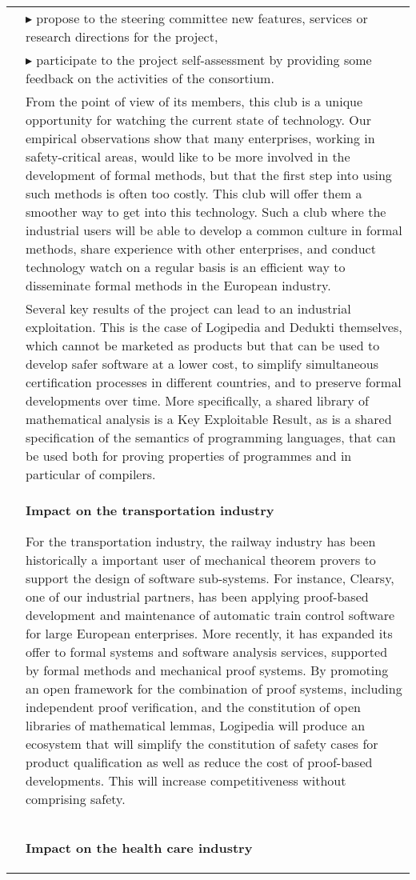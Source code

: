 \begin{longtable}{|p{}|p{}|}
\\
&
$\blacktriangleright$ propose to the steering committee new features,
services or research directions for the project,
\\
&
$\blacktriangleright$ participate to the project self-assessment by providing
some feedback on the activities of the consortium.\\
&
\hspace{0.4cm}
From the point of view of its members, this club is a unique
opportunity for watching the current state of technology. Our empirical observations show that
many enterprises, working in safety-critical areas, would like to be
more involved in the development of formal methods, but that the first
step into using such methods is often too costly. This club will offer
them a smoother way to get into this technology. Such a club
where the industrial users will be able to develop a common culture in
formal methods, share experience with other enterprises, and conduct
technology watch on a regular basis is an efficient way to disseminate
formal methods in the European industry.\\
&
\hspace{0.4cm}
Several key results of the project can lead to an industrial
exploitation. This is the case of Logipedia and Dedukti themselves,
which cannot be marketed as products but that can be used to develop safer
software at a lower cost, to simplify simultaneous certification
processes in different countries, and to preserve formal developments
over time. More specifically, a shared library of mathematical analysis is a Key
Exploitable Result, as is a shared specification of the semantics of
programming languages, that can be used both for proving properties of
programmes and in particular of compilers.\\
&
\vspace{-0.5cm}
\begin{framed}
{\bf\large Impact on the transportation industry}

For the transportation industry, the railway industry has been
historically a important user of mechanical theorem provers to support the
design of software sub-systems. For instance, Clearsy, one of our
industrial partners, has been
applying proof-based development and maintenance of automatic train
control software for large European enterprises. More recently, it has
expanded its offer to formal systems and software analysis services,
supported by formal methods and mechanical proof systems.
By promoting an open framework for the combination of proof systems,
including independent proof verification, and the constitution of open
libraries of mathematical lemmas, Logipedia will produce an ecosystem
that will simplify the constitution of safety cases for product
qualification as well as reduce the cost of proof-based developments.
This will increase competitiveness without comprising safety.
\end{framed}\\
&
\vspace{-0.5cm}
\begin{framed}
{\bf\large Impact on the health care industry}


\end{framed}
\end{longtable}
